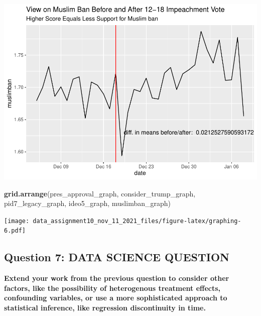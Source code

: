 \documentclass[
]{article}
\newenvironment{Shaded}{\begin{snugshade}}{\end{snugshade}}
\newcommand{\KeywordTok}[1]{\textcolor[rgb]{0.13,0.29,0.53}{\textbf{#1}}}
\newcommand{\NormalTok}[1]{#1}
\begin{document}
\includegraphics{data_assignment10_nov_11_2021_files/figure-latex/graphing-5.pdf}

\begin{Shaded}
\begin{Highlighting}[]
\KeywordTok{grid.arrange}\NormalTok{(pres_approval_graph, consider_trump_graph, pid7_legacy_graph, ideo5_graph, muslimban_graph)}
\end{Highlighting}
\end{Shaded}

\texttt{[image: data\_assignment10\_nov\_11\_2021\_files/figure-latex/graphing-6.pdf]}

\hypertarget{question-7-data-science-question}{%
\subsection{Question 7: DATA SCIENCE
QUESTION}\label{question-7-data-science-question}}

\textbf{Extend your work from the previous question to consider other
factors, like the possibility of heterogenous treatment effects,
confounding variables, or use a more sophisticated approach to
statistical inference, like regression discontinuity in time.}
\end{document}
